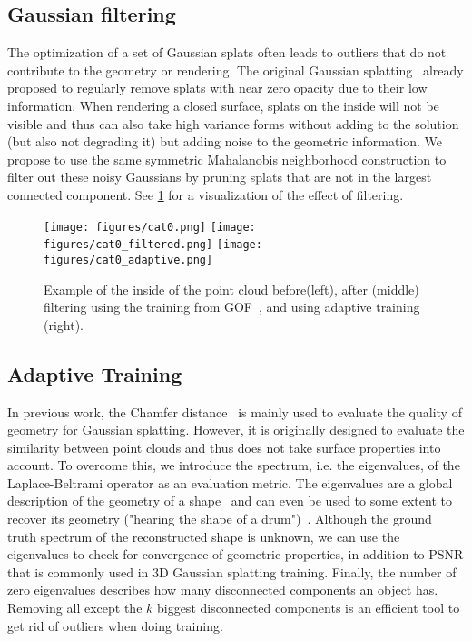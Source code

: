 \subsection{Gaussian filtering} \label{sub:method:filter}

The optimization of a set of Gaussian splats often leads to outliers that do not contribute to the geometry or rendering. 
The original Gaussian splatting~\cite{kerbl3Dgaussians} already proposed to regularly remove splats with near zero opacity due to their low information.
When rendering a closed surface, splats on the inside will not be visible and thus can also take high variance forms without adding to the solution (but also not degrading it) but adding noise to the geometric information. 
We propose to use the same symmetric Mahalanobis neighborhood construction to filter out these noisy Gaussians by pruning splats that are not in the largest connected component.
See \cref{fig:filtering} for a visualization of the effect of filtering. 

\begin{figure}
    \centering
    \texttt{[image: figures/cat0.png]}
    \texttt{[image: figures/cat0\_filtered.png]}
    \texttt{[image: figures/cat0\_adaptive.png]}
    \caption{Example of the inside of the point cloud before(left), after (middle) filtering using the training from GOF~\cite{yu2024gaussian}, and using adaptive training (right).}
    \label{fig:filtering}
\end{figure}

\subsection{Adaptive Training} \label{sub:method:adaptive}
In previous work, the Chamfer distance~\cite{Huang2DGS2024,yu2024gaussian} is mainly used to evaluate the quality of geometry for Gaussian splatting. 
However, it is originally designed to evaluate the similarity between point clouds and thus does not take surface properties into account. 
To overcome this, we introduce the spectrum, i.e. the eigenvalues, of the Laplace-Beltrami operator as an evaluation metric. 
The eigenvalues are a global description of the geometry of a shape~\cite{REUTER2006shapedna} and can even be used to some extent to recover its geometry ("hearing the shape of a drum")~\cite{cosmos2019isospec}.
Although the ground truth spectrum of the reconstructed shape is unknown, we can use the eigenvalues to check for convergence of geometric properties, in addition to PSNR that is commonly used in 3D Gaussian splatting training.
Finally, the number of zero eigenvalues describes how many disconnected components an object has.
Removing all except the $k$ biggest disconnected components is an efficient tool to get rid of outliers when doing training. 
